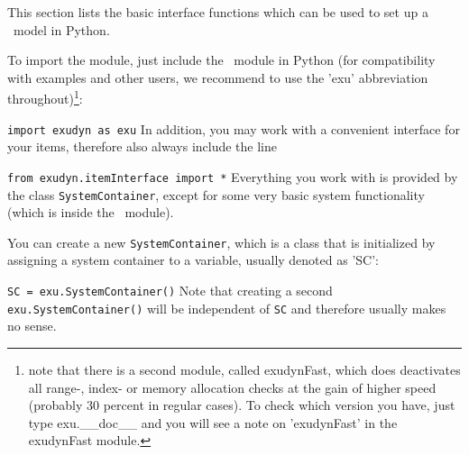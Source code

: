\documentclass[11pt,a4paper]{book}
\renewcommand{\contentsname}{Table of Contents}
\begin{document}
\newpage

\pagestyle{plain}
%

\clearpage{}\pdfbookmark{\contentsname}{toc} 
\tableofcontents

\clearpage
{} 
\setcounter{page}{0}









 \label{sec:PCpp:command:interface}
This section lists the basic interface functions which can be used to set up a \codeName\ model in Python.

To import the module, just include the \codeName\ module in Python (for compatibility with examples and other users, we recommend to use the 'exu' abbreviation throughout)\footnote{note that there is a second module, called exudynFast, which does deactivates all range-, index- or memory allocation checks at the gain of higher speed (probably 30 percent in regular cases). To check which version you have, just type exu.\_\_doc\_\_ and you will see a note on 'exudynFast' in the exudynFast module.}:
\bi
  \item[] \texttt{import exudyn as exu}
\ei
In addition, you may work with a convenient interface for your items, therefore also always include the line
\bi
  \item[] \texttt{from exudyn.itemInterface import *}
\ei
Everything you work with is provided by the class \texttt{SystemContainer}, except for some very basic system functionality (which is inside the \codeName\ module).

You can create a new \texttt{SystemContainer}, which is a class that is initialized by assigning a system container to a variable, usually denoted as 'SC':
\bi
  \item[] \texttt{SC = exu.SystemContainer()}
\ei
Note that creating a second \texttt{exu.SystemContainer()} will be independent of \texttt{SC} and therefore usually makes no sense.
\end{document}
